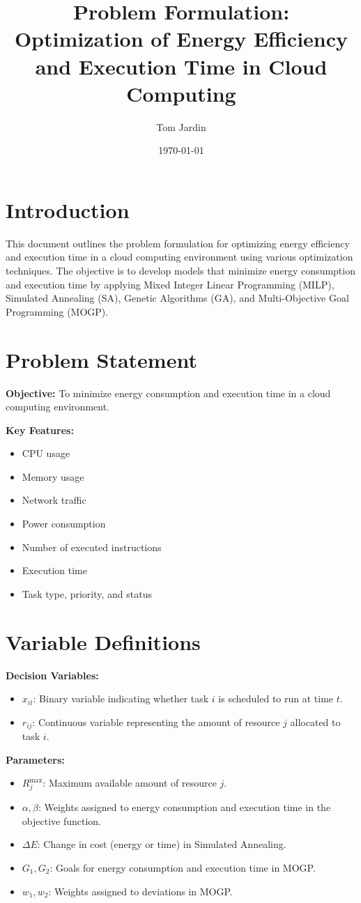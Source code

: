 \documentclass{article}
\title{Problem Formulation: Optimization of Energy Efficiency and Execution Time in Cloud Computing}
\author{Tom Jardin}
\date{\today}
\begin{document}
\maketitle

\section*{Introduction}
This document outlines the problem formulation for optimizing energy efficiency and execution time in a cloud computing environment using various optimization techniques. The objective is to develop models that minimize energy consumption and execution time by applying Mixed Integer Linear Programming (MILP), Simulated Annealing (SA), Genetic Algorithms (GA), and Multi-Objective Goal Programming (MOGP).

\section*{Problem Statement}
\textbf{Objective:} To minimize energy consumption and execution time in a cloud computing environment.

\textbf{Key Features:}
\begin{itemize}
    \item CPU usage
    \item Memory usage
    \item Network traffic
    \item Power consumption
    \item Number of executed instructions
    \item Execution time
    \item Task type, priority, and status
\end{itemize}

\section*{Variable Definitions}
\textbf{Decision Variables:}
\begin{itemize}
    \item \(x_{it}\): Binary variable indicating whether task \(i\) is scheduled to run at time \(t\).
    \item \(r_{ij}\): Continuous variable representing the amount of resource \(j\) allocated to task \(i\).
\end{itemize}

\textbf{Parameters:}
\begin{itemize}
    \item \(R_j^{\text{max}}\): Maximum available amount of resource \(j\).
    \item \(\alpha, \beta\): Weights assigned to energy consumption and execution time in the objective function.
    \item \(\Delta E\): Change in cost (energy or time) in Simulated Annealing.
    \item \(G_1, G_2\): Goals for energy consumption and execution time in MOGP.
    \item \(w_1, w_2\): Weights assigned to deviations in MOGP.
\end{itemize}
\end{document}
